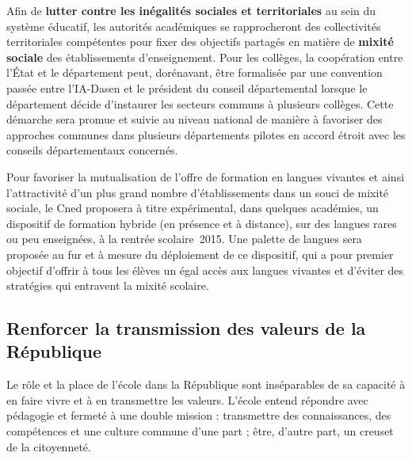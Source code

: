 Afin de \textbf{lutter contre les inégalités sociales et territoriales} au sein du système éducatif, les autorités académiques se rapprocheront des collectivités territoriales compétentes pour fixer des objectifs partagés en matière de \textbf{mixité sociale} des établissements d’enseignement. Pour les collèges, la coopération entre l’État et le département peut, dorénavant, être formalisée par une convention passée entre l’IA-Dasen et le président du conseil départemental lorsque le département décide d’instaurer les secteurs communs à plusieurs collèges. Cette démarche sera promue et suivie au niveau national de manière à favoriser des approches communes dans plusieurs départements pilotes en accord étroit avec les conseils départementaux concernés.

Pour favoriser la mutualisation de l’offre de formation en langues vivantes et ainsi l’attractivité d’un plus grand nombre d’établissements dans un souci de mixité sociale, le Cned proposera à titre expérimental, dans quelques académies, un dispositif de formation hybride (en présence et à distance), sur des langues rares ou peu enseignées, à la rentrée scolaire~2015. Une palette de langues sera proposée au fur et à mesure du déploiement de ce dispositif, qui a pour premier objectif d’offrir à tous les élèves un égal accès aux langues vivantes et d’éviter des stratégies qui entravent la mixité scolaire.

\subsection{Renforcer la transmission des valeurs de la République}
Le rôle et la place de l’école dans la République sont inséparables de sa capacité à en faire vivre et à en transmettre les valeurs. L’école entend répondre avec pédagogie et fermeté à une double mission : transmettre des connaissances, des compétences et une culture commune d’une part ; être, d’autre part, un creuset de la citoyenneté.

